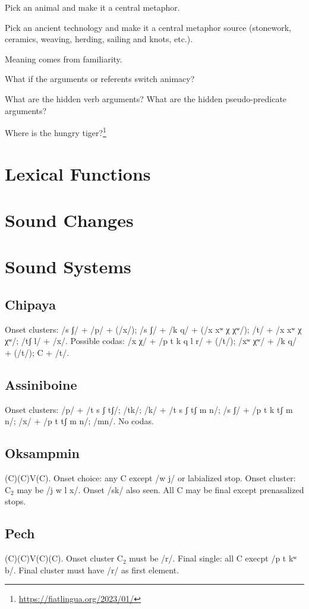 \documentclass[11pt]{article}
\begin{document}
{Pick an animal and make it a central metaphor.

Pick an ancient technology and make it a central metaphor source
(stonework, ceramics, weaving, herding, sailing and knots, etc.).

Meaning comes from familiarity.

What if the arguments or referents switch animacy?

What are the hidden verb arguments?  What are the hidden
pseudo-predicate arguments?

Where is the hungry tiger?\footnote{\url{https://fiatlingua.org/2023/01/}}

\section{Lexical Functions}


\section{Sound Changes}
{\small

}

\section{Sound Systems}

\subsection{Chipaya} Onset clusters: /s ʃ/ + /p/ + (/x/); /s ʃ/ + /k q/ +
(/x xʷ χ χʷ/); /t/ + /x xʷ χ χʷ/; /tʃ l/ + /x/.  Possible codas: /x χ/
+ /p t k q l r/ + (/t/); /xʷ χʷ/ + /k q/ + (/t/); C + /t/. 

\subsection{Assiniboine} Onset clusters: /p/ + /t s ʃ tʃ/; /tk/; /k/ +
/t s ʃ tʃ m n/; /s ʃ/ + /p t k tʃ m n/; /x/ + /p t tʃ m n/; /mn/.  No
codas. 

\subsection{Oksampmin} (C)(C)V(C).  Onset choice: any C except /w j/
or labialized stop.  Onset cluster: C$_{2}$ may be /j w l x/.  Onset
/sk/ also seen.  All C may be final except prenasalized stops.

\subsection{Pech} (C)(C)V(C)(C).  Onset cluster C$_{2}$ must be /r/.
Final single: all C execpt /p t kʷ b/.  Final cluster must have /r/ as
first element.

}
\end{document}
